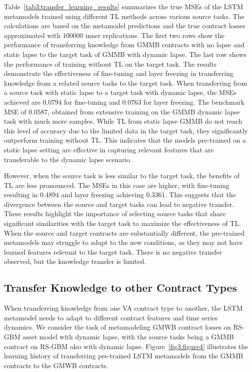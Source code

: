 Table~\ref{tab3:transfer_learning_results} summarizes the true MSEs of the LSTM metamodels trained using different TL methods across various source tasks.
The calculations are based on the metamodel predictions and the true contract losses approximated with $\num{100000}$ inner replications.
The first two rows show the performance of transferring knowledge from GMMB contracts with no lapse and static lapse to the target task of GMMB with dynamic lapse.
The last row shows the performance of training without TL on the target task.
The results demonstrate the effectiveness of fine-tuning and layer freezing in transferring knowledge from a related source tasks to the target task. 
When transferring from a source task with static lapse to a target task with dynamic lapse, the MSEs achieved are $0.0794$ for fine-tuning and $0.0763$ for layer freezing.
The benchmark MSE of $0.0587$, obtained from extensive training on the GMMB dynamic lapse task with much more samples.
While TL from static lapse GMMB do not reach this level of accuracy due to the limited data in the target task, they significantly outperform training without TL. 
This indicates that the models pre-trained on a static lapse setting are effective in capturing relevant features that are transferable to the dynamic lapse scenario.

However, when the source task is less similar to the target task, the benefits of TL are less pronounced. The MSEs in this case are higher, with fine-tuning resulting in $0.4894$ and layer freezing achieving $0.3361$. 
This suggests that the divergence between the source and target tasks can lead to negative transfer.
These results highlight the importance of selecting source tasks that share significant similarities with the target task to maximize the effectiveness of TL. 
When the source and target contracts are substantially different, the pre-trained metamodels may struggle to adapt to the new conditions, as they may not have learned features relevant to the target task.
There is no negative transfer observed, but the knowledge transfer is limited.

\subsection{Transfer Knowledge to other Contract Types}

When transferring knowledge from one VA contract type to another, the LSTM metamodel needs to adapt to different contract features and time series dynamics.
We consider the task of metamodeling GMWB contract losses on RS-GBM asset model with dynamic lapse, with the source tasks being a GMMB contract on RS-GBM also with dynamic lapse.
Figure~\ref{fig3:figure4} illustrates the learning history of transferring pre-trained LSTM metamodels from the GMMB contracts to the GMWB contracts.

